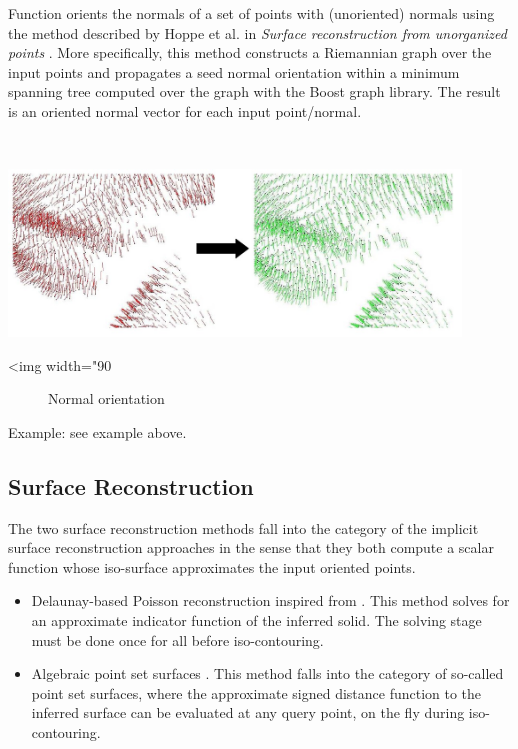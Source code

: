 Function  orients the normals of a set of points with (unoriented) normals using the method described by Hoppe et al. in {\em Surface reconstruction from unorganized points} \cite{cgal:hddms-srup-92}. More specifically, this method constructs a Riemannian graph over the input points and propagates a seed normal orientation within a minimum spanning tree computed over the graph with the Boost graph library. The result is an oriented normal vector for each input point/normal.

  \\

\begin{center}
    \label{Surface_reconstruction_3-fig-mst_normal_orientation}
    \begin{ccTexOnly}
        \includegraphics[width=0.9\textwidth]{Surface_reconstruction_3/mst_normal_orientation} %
    \end{ccTexOnly}
    \begin{ccHtmlOnly}
        <img width="90%
    \end{ccHtmlOnly}
    \begin{figure}[h]
        \caption{Normal orientation}
    \end{figure}
\end{center}

Example: see  example above.

\subsection{Surface Reconstruction}

The two surface reconstruction methods fall into the category of the implicit surface reconstruction approaches in the sense that they both compute a scalar function whose iso-surface approximates the input oriented points.
\begin{itemize}
\item Delaunay-based Poisson reconstruction inspired
      from \cite{Kazhdan06}. This method solves for
      an approximate indicator function of the inferred
      solid. The solving stage must be done once for all
      before iso-contouring. %
\item Algebraic point set surfaces \cite{Guennebaud07}.
      This method falls into the category of so-called
      point set surfaces, where the approximate
      signed distance function to the inferred surface
      can be evaluated at any query point, on the fly
      during iso-contouring.
\end{itemize}

